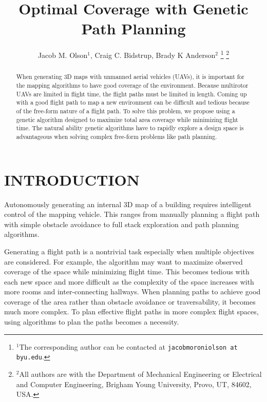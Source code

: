 \documentclass[letterpaper, 10 pt, conference]{ieeeconf}  %
\title{\LARGE \bf
Optimal Coverage with Genetic Path Planning
}
\author{Jacob M. Olson$^{1}$, Craig C. Bidstrup, Brady K Anderson$^{2}$%
\thanks{$^{1}$The corresponding author can be contacted at
        {\tt\small jacobmoroniolson at byu.edu}.}%
\thanks{$^{2}$All authors are with the Department of Mechanical Engineering or Electrical and Computer Engineering,
        Brigham Young University, Provo, UT, 84602, USA.}%
}
\begin{document}
\maketitle
\thispagestyle{empty}
\pagestyle{empty}


\begin{abstract}

When generating 3D maps with unmanned aerial vehicles (UAVs), it is important for the mapping algorithms to have good coverage of the environment. Because multirotor UAVs are limited in flight time, the flight paths must be limited in length. Coming up with a good flight path to map a new environment can be difficult and tedious because of the free-form nature of a flight path. To solve this problem, we propose using a genetic algorithm designed to maximize total area coverage while minimizing flight time. The natural ability genetic algorithms have to rapidly explore a design space is advantageous when solving complex free-form problems like path planning.

\end{abstract}


\section{INTRODUCTION}


Autonomously generating an internal 3D map of a building requires intelligent control of the mapping vehicle. This ranges from manually planning a flight path with simple obstacle avoidance to full stack exploration and path planning algorithms.

Generating a flight path is a nontrivial task especially when multiple objectives are considered. For example, the algorithm may want to maximize observed coverage of the space while minimizing flight time. This becomes tedious with each new space and more difficult as the complexity of the space increases with more rooms and inter-connecting hallways. When planning paths to achieve good coverage of the area rather than obstacle avoidance or traversability, it becomes much more complex. To plan effective flight paths in more complex flight spaces, using algorithms to plan the paths becomes a necessity.
\end{document}
